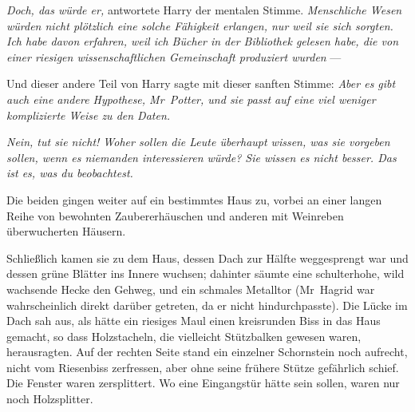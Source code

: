 \emph{Doch, das würde er,} antwortete Harry der mentalen Stimme. \emph{Menschliche Wesen würden nicht plötzlich eine solche Fähigkeit erlangen, nur weil sie sich sorgten. Ich habe davon erfahren, weil ich Bücher in der Bibliothek gelesen habe, die von einer riesigen wissenschaftlichen Gemeinschaft produziert wurden} —

Und dieser andere Teil von Harry sagte mit dieser sanften Stimme: \emph{Aber es gibt auch eine andere Hypothese, Mr~Potter, und sie passt auf eine viel weniger komplizierte Weise zu den Daten.}


\emph{Nein, tut sie nicht! Woher sollen die Leute überhaupt wissen, was sie vorgeben sollen, wenn es niemanden interessieren würde? Sie wissen es nicht besser. Das ist es, was du beobachtest.}

Die beiden gingen weiter auf ein bestimmtes Haus zu, vorbei an einer langen Reihe von bewohnten Zaubererhäuschen und anderen mit Weinreben überwucherten Häusern.

Schließlich kamen sie zu dem Haus, dessen Dach zur Hälfte weggesprengt war und dessen grüne Blätter ins Innere wuchsen; dahinter säumte eine schulterhohe, wild wachsende Hecke den Gehweg, und ein schmales Metalltor (Mr~Hagrid war wahrscheinlich direkt darüber getreten, da er nicht hindurchpasste).
Die Lücke im Dach sah aus, als hätte ein riesiges Maul einen kreisrunden Biss in das Haus gemacht, so dass Holzstacheln, die vielleicht Stützbalken gewesen waren, herausragten. Auf der rechten Seite stand ein einzelner Schornstein noch aufrecht, nicht vom Riesenbiss zerfressen, aber ohne seine frühere Stütze gefährlich schief. Die Fenster waren zersplittert. Wo eine Eingangstür hätte sein sollen, waren nur noch Holzsplitter.

